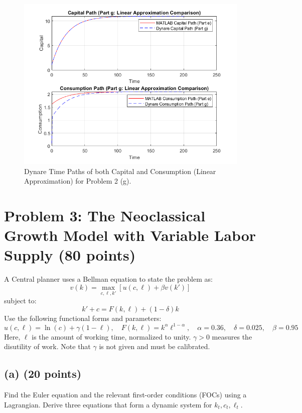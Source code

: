 \documentclass[12pt]{article}
\begin{document}
\begin{figure}[H]
    \centering
        \includegraphics[width=\textwidth]{pset3_2g.png}
        \caption{Dynare Time Paths of both Capital and Consumption (Linear Approximation) for Problem 2 (g).}
        \label{fig:2g}
\end{figure}

\section*{Problem 3: The Neoclassical Growth Model with Variable Labor Supply (80 points)}
A Central planner uses a Bellman equation to state the problem as:
\[
v(k) = \max_{c, \ell, k'} \left[ u(c, \ell) + \beta v(k') \right]
\]
subject to:
\[
k' + c = F(k, \ell) + (1 - \delta)k
\]
Use the following functional forms and parameters:
\[
u(c, \ell) = \ln(c) + \gamma(1 - \ell), \quad F(k, \ell) = k^\alpha \ell^{1-\alpha}, \quad \alpha = 0.36, \quad \delta = 0.025, \quad \beta = 0.95
\]
Here, \( \ell \) is the amount of working time, normalized to unity. \( \gamma > 0 \) measures the disutility of work. Note that \( \gamma \) is not given and must be calibrated.

\subsection*{(a) (20 points)}
Find the Euler equation and the relevant first-order conditions (FOCs) using a Lagrangian. Derive three equations that form a dynamic system for \( k_t, c_t, \ell_t \).
\end{document}

